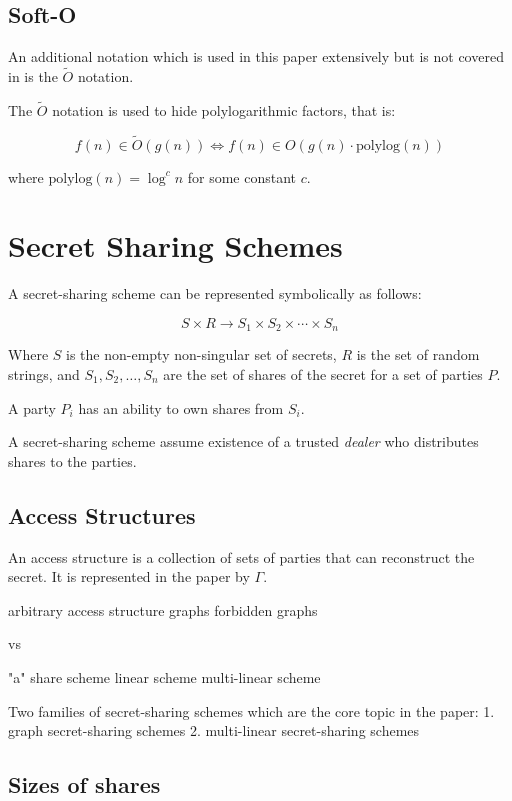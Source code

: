 \subsection{Soft-O}

An additional notation which is used in this paper extensively but is not covered in \cite{cormen2009introduction} is the $\tilde{O}$ notation.

The $\tilde{O}$ notation is used to hide polylogarithmic factors, that is:

\[
    f(n) \in \tilde{O}(g(n)) \Longleftrightarrow f(n) \in O(g(n) \cdot \text{polylog}(n))
\]

where $\text{polylog}(n) = \log^c n$ for some constant $c$.

\section{Secret Sharing Schemes}

A secret-sharing scheme can be represented symbolically as follows:

\[
    S \times R \rightarrow S_1 \times S_2 \times \cdots \times S_n
\]

Where $S$ is the non-empty non-singular set of secrets, $R$ is the set of random strings, and $S_1, S_2, \ldots, S_n$ are the set of shares of the secret for a set of parties $P$.

A party $P_i$ has an ability to own shares from $S_i$.

A secret-sharing scheme assume existence of a trusted \textit{dealer} who distributes shares to the parties.

\subsection{Access Structures}

An access structure is a collection of sets of parties that can reconstruct the secret.
It is represented in the paper by $\Gamma$.


arbitrary access structure
graphs
forbidden graphs

vs 

"a" share scheme
linear scheme
multi-linear scheme

Two families of secret-sharing schemes which are the core topic in the paper:
1. graph secret-sharing schemes 
2. multi-linear secret-sharing schemes

\subsection{Sizes of shares}

